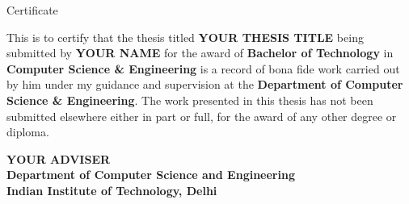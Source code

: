 \begin{center}
\LARGE{ Certificate} 
\end{center}

\vspace{0.5in}

This is to certify that the thesis titled {\bfseries YOUR THESIS TITLE} being submitted by
{\bfseries YOUR NAME} for the award of {\bfseries Bachelor of Technology} in {\bfseries Computer Science \& Engineering} is a record of bona fide work carried out by him under my guidance and supervision at the {\bfseries Department of Computer Science \& Engineering}. The work presented in this thesis has not been submitted elsewhere either in part or full, for the award of any other degree or diploma.

\vspace{1.5in}


{\bfseries YOUR ADVISER} \\
{\bfseries Department of Computer Science and Engineering} \\
{\bfseries Indian Institute of Technology, Delhi}\\ 
